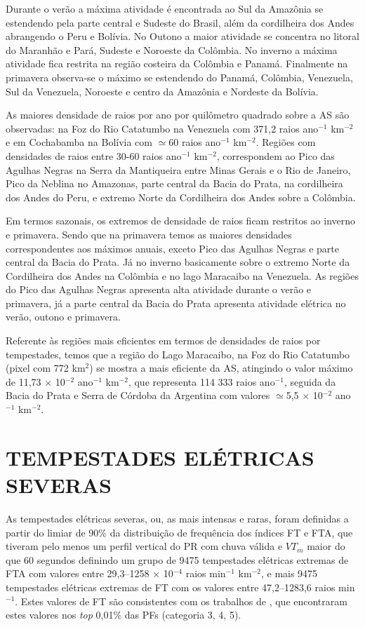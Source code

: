 Durante o verão a máxima atividade é encontrada ao Sul da Amazônia se estendendo pela parte central e Sudeste do Brasil, além da cordilheira dos Andes abrangendo o Peru e Bolívia. No Outono a maior atividade se concentra no litoral do Maranhão e Pará, Sudeste e Noroeste  da Colômbia. No inverno a máxima atividade  fica restrita na região costeira da Colômbia e Panamá. Finalmente na primavera observa-se o máximo se estendendo do Panamá, Colômbia, Venezuela, Sul da Venezuela, Noroeste e centro da Amazônia e Nordeste da Bolívia. 
 
As maiores densidade de raios por ano por quilômetro quadrado sobre a AS são observadas: na Foz do Rio Catatumbo na Venezuela com 371,2 raios ano$^{-1}$ km$^{-2}$ e em Cochabamba na Bolívia com $\simeq$60  raios ano$^{-1}$ km$^{-2}$. Regiões com densidades de raios entre 30-60 raios ano$^{-1}$ km$^{-2}$, correspondem ao Pico das Agulhas Negras na Serra da Mantiqueira entre Minas Gerais e o Rio de Janeiro, Pico da Neblina no Amazonas, parte central da Bacia do Prata, na cordilheira dos Andes do Peru, e extremo Norte da Cordilheira dos Andes sobre a Colômbia. 

Em termos sazonais, os extremos de densidade de raios ficam restritos ao inverno e primavera. Sendo que na primavera temos as maiores densidades correspondentes aos máximos anuais, exceto Pico das Agulhas Negras e parte central da Bacia do Prata. Já no inverno basicamente sobre o extremo Norte da Cordilheira dos Andes na Colômbia e no lago Maracaibo na Venezuela. As regiões do Pico das Agulhas Negras apresenta alta atividade durante o verão e primavera, já  a parte central da Bacia do Prata apresenta atividade elétrica  no verão, outono e primavera.


Referente às regiões mais eficientes em termos de densidades de raios por tempestades, temos que a região do Lago Maracaibo, na Foz do Rio Catatumbo (pixel com 772 km$^{2}$) se mostra a mais eficiente da AS, atingindo o valor máximo de 11,73 $\times$ 10$^{-2}$ ano$^{-1}$ km$^{-2}$, que representa {114 333} raios ano$^{-1}$, seguida da Bacia do Prata e Serra de Córdoba da Argentina com valores $\simeq$5,5 $\times$ 10$^{-2}$ ano$^{-1}$ km$^{-2}$.


\section{TEMPESTADES ELÉTRICAS SEVERAS}

As tempestades elétricas severas, ou, as mais intensas e raras, foram definidas a partir do limiar de 90\% da distribuição de frequência dos índices FT e FTA, que tiveram pelo menos um perfil vertical do PR com chuva válida e $VT_m$ maior do que 60 segundos  definindo um grupo de 9475 tempestades elétricas extremas de FTA com valores entre 29,3--1258 $\times$ 10$^{-4}$ raios min$^{-1}$ km$^{-2}$, e mais 9475 tempestades elétricas extremas de FT com os valores entre 47,2--1283,6 raios min$^{-1}$.  Estes valores de FT são consistentes com os trabalhos de , que encontraram estes valores nos \textit{top} 0,01\% das PFs (categoria 3, 4, 5).


